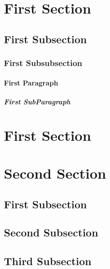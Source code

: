\documentclass{article}
\begin{document}
\section{First Section}
\subsection{First Subsection}
\subsubsection{First Subsubsection}
\paragraph{First Paragraph}
\subparagraph{First SubParagraph}
\section{First Section}
\section{Second Section}
\subsection{First Subsection}
\subsection{Second Subsection}
\subsection{Third Subsection}
\end{document}
